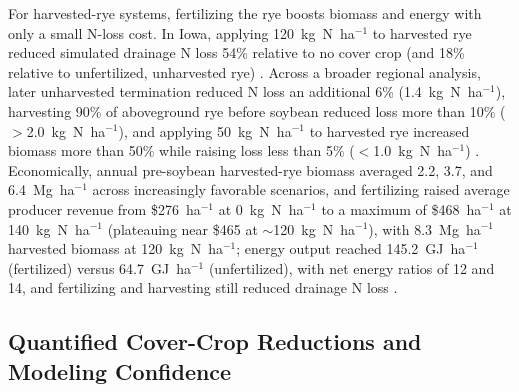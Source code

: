 For harvested-rye systems, fertilizing the rye boosts biomass and energy with only a small N-loss cost. In Iowa, applying 120~kg~N~ha$^{-1}$ to harvested rye reduced simulated drainage N loss 54\% relative to no cover crop (and 18\% relative to unfertilized, unharvested rye) \parencite{Malone2018}. Across a broader regional analysis, later unharvested termination reduced N loss an additional 6\% (1.4~kg~N~ha$^{-1}$), harvesting 90\% of aboveground rye before soybean reduced loss more than 10\% ($>$2.0~kg~N~ha$^{-1}$), and applying 50~kg~N~ha$^{-1}$ to harvested rye increased biomass more than 50\% while raising loss less than 5\% ($<$1.0~kg~N~ha$^{-1}$) \parencite{Malone2023}. Economically, annual pre-soybean harvested-rye biomass averaged 2.2, 3.7, and 6.4~Mg~ha$^{-1}$ across increasingly favorable scenarios, and fertilizing raised average producer revenue from \$276~ha$^{-1}$ at 0~kg~N~ha$^{-1}$ to a maximum of \$468~ha$^{-1}$ at 140~kg~N~ha$^{-1}$ (plateauing near \$465 at $\sim$120~kg~N~ha$^{-1}$), with 8.3~Mg~ha$^{-1}$ harvested biomass at 120~kg~N~ha$^{-1}$; energy output reached 145.2~GJ~ha$^{-1}$ (fertilized) versus 64.7~GJ~ha$^{-1}$ (unfertilized), with net energy ratios of 12 and 14, and fertilizing and harvesting still reduced drainage N loss \parencite{Malone2018}.

\subsection{Quantified Cover-Crop Reductions and Modeling Confidence}

